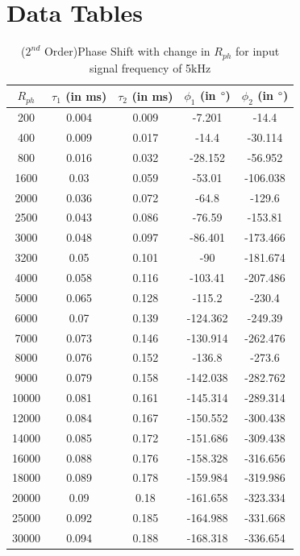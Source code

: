 \documentclass[10pt, conference]{IEEEtran}
\begin{document}
% 		
	
% 		
	
		
\section{Data Tables}

\begin{table}[H]
    \centering
    \caption{($2^{nd}$ Order)Phase Shift with change in $R_{ph}$ for input signal frequency of 5kHz}
\begin{tabular}{|c|c|c|c|c|}
\hline
$R_{ph}$ & $\tau_1$ (in ms) & $\tau_2$ (in ms) & $\phi_1$  (in $\degree$) & $\phi_2$ (in $\degree$) \\ 
\hline
200 & 0.004 & 0.009 & -7.201 & -14.4 \\ 
400 & 0.009 & 0.017 & -14.4 & -30.114 \\ 
800 & 0.016 & 0.032 & -28.152 & -56.952 \\ 
1600 & 0.03 & 0.059 & -53.01 & -106.038 \\ 
2000 & 0.036 & 0.072 & -64.8 & -129.6 \\ 
2500 & 0.043 & 0.086 & -76.59 & -153.81 \\ 
3000 & 0.048 & 0.097 & -86.401 & -173.466 \\ 
3200 & 0.05 & 0.101 & -90 & -181.674 \\ 
4000 & 0.058 & 0.116 & -103.41 & -207.486 \\ 
5000 & 0.065 & 0.128 & -115.2 & -230.4 \\ 
6000 & 0.07 & 0.139 & -124.362 & -249.39 \\ 
7000 & 0.073 & 0.146 & -130.914 & -262.476 \\ 
8000 & 0.076 & 0.152 & -136.8 & -273.6 \\ 
9000 & 0.079 & 0.158 & -142.038 & -282.762 \\ 
10000 & 0.081 & 0.161 & -145.314 & -289.314 \\ 
12000 & 0.084 & 0.167 & -150.552 & -300.438 \\ 
14000 & 0.085 & 0.172 & -151.686 & -309.438 \\ 
16000 & 0.088 & 0.176 & -158.328 & -316.656 \\ 
18000 & 0.089 & 0.178 & -159.984 & -319.986 \\ 
20000 & 0.09 & 0.18 & -161.658 & -323.334 \\ 
25000 & 0.092 & 0.185 & -164.988 & -331.668 \\ 
30000 & 0.094 & 0.188 & -168.318 & -336.654 \\ 
\hline
\end{tabular}
    \label{tab:delay_vs_rph}
\end{table}
\end{document}
